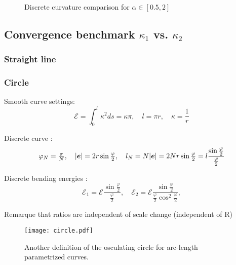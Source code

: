 \begin{figure}[H]
\begin{center}

\end{center}
\caption{Discrete curvature comparison for $\alpha \in [0.5,2]$}
\end{figure}

\subsection{Convergence benchmark $\kappa_1$ vs. $\kappa_2$}

\subsubsection{Straight line}

\subsubsection{Circle}

Smooth curve settings:
\begin{equation}
	\mathcal{E} = \int_0^l \kappa^2 ds = \kappa \pi,
	\quad
	l = \pi r,
	\quad
	\kappa = \frac{1}{r}
\end{equation}

Discrete curve :
\begin{equation}
	\varphi_N = \tfrac{\pi}{N},
	\quad
	|\boldsymbol{e}| = 2r\sin \tfrac{\varphi}{2},
	\quad
	l_N = N|\boldsymbol{e}| =2Nr\sin \tfrac{\varphi}{2} = l \frac{\sin \tfrac{\varphi}{2}}{\tfrac{\varphi}{2}}
\end{equation}

Discrete bending energies :
\begin{equation}
	\mathcal{E}_1 = \mathcal{E} \frac{\sin \tfrac{\varphi}{2}}{\tfrac{\varphi}{2}},
	\quad
	\mathcal{E}_2 = \mathcal{E} \frac{\sin \tfrac{\varphi}{2}}{\tfrac{\varphi}{2} \cos^2 \tfrac{\varphi}{2}},
\end{equation}

Remarque that ratios are independent of scale change (independent of R)

\begin{figure}[H]
\begin{center}
\texttt{[image: circle.pdf]}
\caption{Another definition of the osculating circle for arc-length parametrized curves.}
\label{fig:1_1}
\end{center}
\end{figure}

